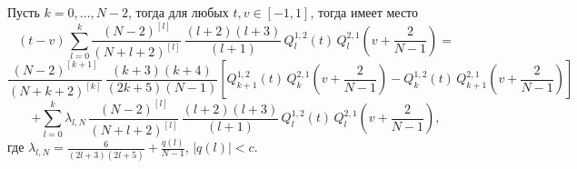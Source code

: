 \documentclass[12pt]{book}
\begin{document}
\begin{lemma}\label{lemma1}
Пусть $k=0, \ldots, N-2$, тогда для любых $t,v \in [-1,1]$, тогда имеет место
\begin{equation*}
    \left(
    t-v
    \right)\,
   \sum_{l=0}^{k}
    \frac{(N-2)^{[l]}}{(N+l+2)^{[l]}} \, \frac{(l+2)(l+3)}{(l+1)}\,
    Q^{1,2}_{l}(t) \,Q^{2,1}_{l}\left(v +\frac{2}{N-1} \right)
    =
\end{equation*}
\begin{equation*}
   \frac{(N-2)^{[k+1]}}{(N+k+2)^{[k]}}  \,
   \frac{(k+3)(k+4)}{(2k+5)(N-1)}
   \left[
        Q^{1,2}_{k+1}(t) \,Q^{2,1}_{k}\left(v +\frac{2}{N-1} \right) -  Q^{1,2}_{k}(t) \, Q^{2,1}_{k+1} \left(v +\frac{2}{N-1} \right)
   \right]
\end{equation*}
\begin{equation}\label{lem1eq}
   +
   \sum_{l=0}^{k} \lambda_{l,N} \,
    \frac{(N-2)^{[l]}}{(N+l+2)^{[l]}} \, \frac{(l+2)(l+3)}{(l+1)}\,
    Q^{1,2}_{l}(t) \,Q^{2,1}_{l}\left(v +\frac{2}{N-1} \right),
\end{equation}
где $\lambda_{l,N} = \frac{6}{(2l+3)(2l+5)}+\frac{q(l)}{N-1}$, $|q(l)|<c$.
\end{lemma}


\end{document}
